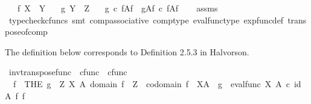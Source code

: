 \begin{isabellebody}
\ \ \ {\isachardoublequoteopen}f{\isacharcolon}{\kern0pt}\ X\ {\isasymrightarrow}\ Y{\isachardoublequoteclose}\isanewline
\ \ \ {\isachardoublequoteopen}g{\isacharcolon}{\kern0pt}\ Y\ {\isasymrightarrow}\ Z{\isachardoublequoteclose}\isanewline
\ \ \ {\isachardoublequoteopen}{\isacharparenleft}{\kern0pt}g\ {\isasymcirc}\isactrlsub c\ f{\isacharparenright}{\kern0pt}\isactrlbsup A\isactrlesup \isactrlsub f\ {\isacharequal}{\kern0pt}\ {\isacharparenleft}{\kern0pt}g\isactrlbsup A\isactrlesup \isactrlsub f{\isacharparenright}{\kern0pt}\ {\isasymcirc}\isactrlsub c\ {\isacharparenleft}{\kern0pt}f\isactrlbsup A\isactrlesup \isactrlsub f{\isacharparenright}{\kern0pt}{\isachardoublequoteclose}\isanewline
%
\isadelimproof
\ \ %
\endisadelimproof
%
\isatagproof
{}\isamarkupfalse%
\ assms\ \isamarkupfalse%
\ {\isacharparenleft}{\kern0pt}typecheck{\isacharunderscore}{\kern0pt}cfuncs{\isacharcomma}{\kern0pt}\ smt\ comp{\isacharunderscore}{\kern0pt}associative{}\ comp{\isacharunderscore}{\kern0pt}type\ eval{\isacharunderscore}{\kern0pt}func{\isacharunderscore}{\kern0pt}type\ exp{\isacharunderscore}{\kern0pt}func{\isacharunderscore}{\kern0pt}def{}\ transpose{\isacharunderscore}{\kern0pt}of{\isacharunderscore}{\kern0pt}comp{\isacharparenright}{\kern0pt}%
\endisatagproof
{\isafoldproof}%
%
\isadelimproof
%
\endisadelimproof
%
\isadelimdocument
%
\endisadelimdocument
%
\isatagdocument
%
\isamarkuptrue%
%
\endisatagdocument
{\isafolddocument}%
%
\isadelimdocument
%
\endisadelimdocument
%
\begin{isamarkuptext}%
The definition below corresponds to Definition 2.5.3 in Halvorson.%
\end{isamarkuptext}\isamarkuptrue%
\isamarkupfalse%
\ inv{\isacharunderscore}{\kern0pt}transpose{\isacharunderscore}{\kern0pt}func\ {\isacharcolon}{\kern0pt}{\isacharcolon}{\kern0pt}\ {\isachardoublequoteopen}cfunc\ {\isasymRightarrow}\ cfunc{\isachardoublequoteclose}\ {\isacharparenleft}{\kern0pt}{\isachardoublequoteopen}{\isacharunderscore}{\kern0pt}\isactrlsup {\isasymflat}{\isachardoublequoteclose}\ {\isacharbrackleft}{\kern0pt}{}{}{}{\isacharbrackright}{\kern0pt}{}{}{}{\isacharparenright}{\kern0pt}\ \isanewline
\ \ {\isachardoublequoteopen}f\isactrlsup {\isasymflat}\ {\isacharequal}{\kern0pt}\ {\isacharparenleft}{\kern0pt}THE\ g{\isachardot}{\kern0pt}\ {\isasymexists}\ Z\ X\ A{\isachardot}{\kern0pt}\ domain\ f\ {\isacharequal}{\kern0pt}\ Z\ {\isasymand}\ codomain\ f\ {\isacharequal}{\kern0pt}\ X\isactrlbsup A\isactrlesup \ {\isasymand}\ g\ {\isacharequal}{\kern0pt}\ {\isacharparenleft}{\kern0pt}eval{\isacharunderscore}{\kern0pt}func\ X\ A{\isacharparenright}{\kern0pt}\ {\isasymcirc}\isactrlsub c\ {\isacharparenleft}{\kern0pt}id\ A\ {\isasymtimes}\isactrlsub f\ f{\isacharparenright}{\kern0pt}{\isacharparenright}{\kern0pt}{\isachardoublequoteclose}\isanewline

\end{isabellebody}
